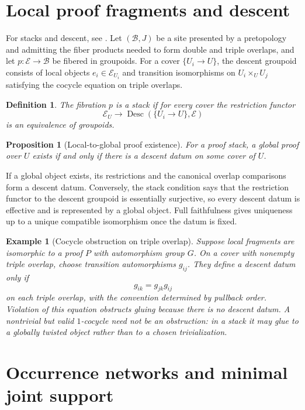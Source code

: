\documentclass[12pt,a4paper,twoside]{extarticle}
\makeatletter
\theoremstyle{compactplain}
\newtheorem{proposition}[theorem]{Proposition}
\theoremstyle{compactdef}
\newtheorem{definition}[theorem]{Definition}
\newtheorem{example}[theorem]{Example}
\renewenvironment{proof}[1][\proofname]{\par\pushQED{\qed}\normalfont
  \topsep2pt\trivlist\item[\hskip\labelsep\bfseries #1\@addpunct{.}]\ignorespaces}
 {\popQED\endtrivlist\@endpefalse}
\makeatother
\begin{document}
\section{Local proof fragments and descent}
For stacks and descent, see \cite{maclane-moerdijk,coquand-mannaa-ruch}.
Let $(\mathcal B,J)$ be a site presented by a pretopology and admitting the fiber products needed to form double and triple overlaps, and let $p:\mathcal E\to\mathcal B$ be fibered in groupoids. For a cover $\{U_i\to U\}$, the descent groupoid consists of local objects $e_i\in\mathcal E_{U_i}$ and transition isomorphisms on $U_i\times_UU_j$ satisfying the cocycle equation on triple overlaps.

\begin{definition}
The fibration $p$ is a stack if for every cover the restriction functor
\[
\mathcal E_U\to\operatorname{Desc}(\{U_i\to U\},\mathcal E)
\]
is an equivalence of groupoids.
\end{definition}

\begin{proposition}[Local-to-global proof existence]
For a proof stack, a global proof over $U$ exists if and only if there is a descent datum on some cover of $U$.
\end{proposition}
\begin{proof}
If a global object exists, its restrictions and the canonical overlap comparisons form a descent datum.  Conversely, the stack condition says that the restriction functor to the descent groupoid is essentially surjective, so every descent datum is effective and is represented by a global object.  Full faithfulness gives uniqueness up to a unique compatible isomorphism once the datum is fixed.
\end{proof}

\begin{example}[Cocycle obstruction on triple overlap]
Suppose local fragments are isomorphic to a proof $P$ with automorphism group $G$. On a cover with nonempty triple overlap, choose transition automorphisms $g_{ij}$. They define a descent datum only if
\[
g_{ik}=g_{jk}g_{ij}
\]
on each triple overlap, with the convention determined by pullback order. Violation of this equation obstructs gluing because there is no descent datum. A nontrivial but valid $1$-cocycle need not be an obstruction: in a stack it may glue to a globally twisted object rather than to a chosen trivialization.
\end{example}
\section{Occurrence networks and minimal joint support}
\end{document}
